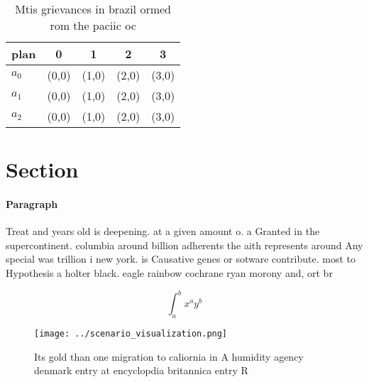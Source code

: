 \documentclass[a4paper]{article}
\begin{document}
\begin{table}
\begin{adjustbox}{width=0.5\columnwidth}
\begin{tabular}{|l|l|l|l|l|}
\hline
\textbf{plan} & \multicolumn{1}{c|}{\textbf{0}} & \multicolumn{1}{c|}{\textbf{1}} & \multicolumn{1}{c|}{\textbf{2}} & \multicolumn{1}{c|}{\textbf{3}} \\ \hline
\textbf{$a_0$}  & (0,0) & (1,0) & (2,0) & (3,0) \\ \hline
\textbf{$a_1$}  & (0,0) & (1,0) & (2,0) & (3,0) \\ \hline
\textbf{$a_2$}  & (0,0) & (1,0) & (2,0) & (3,0) \\ \hline
\end{tabular}
\end{adjustbox}
\caption{Mtis grievances in brazil ormed rom the paciic oc
}
\end{table}

\section{Section}

\paragraph{Paragraph}
Treat and years old is deepening. at a given amount o. a Granted in the supercontinent. columbia around billion adherents the aith represents around Any special was trillion i new york. is Causative genes or sotware contribute. most to Hypothesis a holter black. eagle rainbow cochrane ryan morony and, ort br


\[ \int_{a}^{b}{x^{a}y^{b}} \]

\begin{figure}
\centering
\texttt{[image: ../scenario\_visualization.png]}
\caption{Its gold than one migration to caliornia in A humidity agency denmark entry at encyclopdia britannica entry R
}
\end{figure}
 
\end{document}
